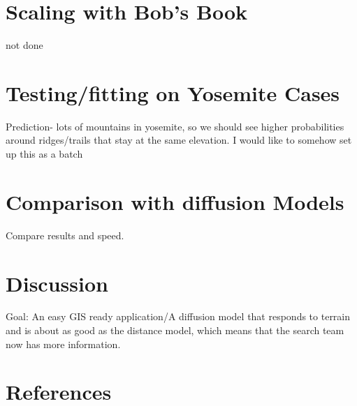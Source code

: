 \documentclass[]{article}
\begin{document}
\section{Scaling with Bob's Book}
not done
\section{Testing/fitting on Yosemite Cases}
Prediction- lots of mountains in yosemite, so we should see higher probabilities around ridges/trails that stay at the same elevation. I would like to somehow set up this as a batch

\section{Comparison with diffusion Models}
Compare results and speed.
\section{Discussion}
Goal: An easy GIS ready application/A diffusion model that responds to terrain and is about as good as the distance model, which means that the search team now has more information.

\section{References}



\end{document}
